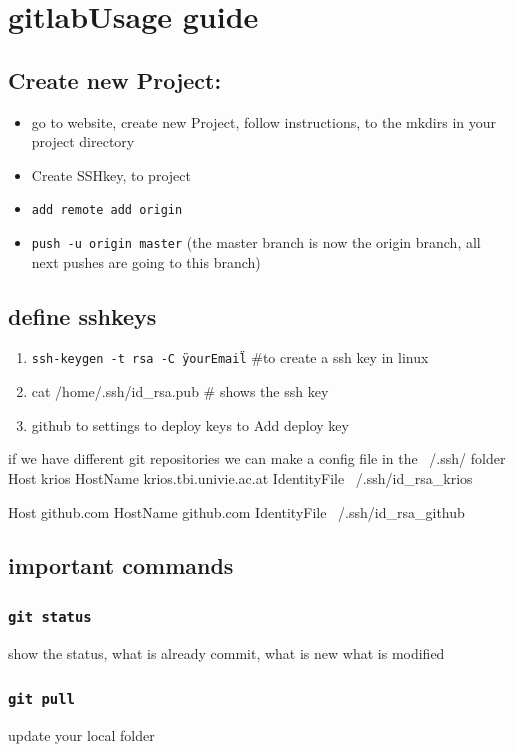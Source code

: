 \documentclass[ twoside,openright,titlepage,numbers=noenddot,headinclude,%
                footinclude=true, cleardoublepage=empty,abstractoff, %
                BCOR=5mm,paper=a4,fontsize=11pt,%
                ]{scrreprt}
\begin{document}
\chapter{gitlabUsage guide}
\section{Create new Project:}

\begin{itemize}
	\item go to website, create new Project, follow instructions, to the mkdirs in  your project directory
	\item Create SSHkey, to project
	\item \texttt{add remote add origin}
	\item \texttt{push -u origin master}    (the master branch is now the origin branch, all next pushes are going to this branch)
\end{itemize}

\section{define sshkeys}

\begin{enumerate}
\item \texttt{ssh-keygen -t rsa -C \"yourEmail\"} \#to create a ssh key in linux
\item cat /home/.ssh/id\_rsa.pub   \# shows the ssh key
\item github to settings to deploy keys to Add deploy key
\end{enumerate}

if we have different git repositories we can make a config file in the 
~/.ssh/ folder
Host krios
HostName krios.tbi.univie.ac.at
IdentityFile ~/.ssh/id\_rsa\_krios

Host github.com
HostName github.com
IdentityFile ~/.ssh/id\_rsa\_github




\section{important commands}
\subsection{\texttt{git status}}
	show the status, what is already commit, what is new what is modified
\subsection{\texttt{git pull}}
	update your local folder
\end{document}
